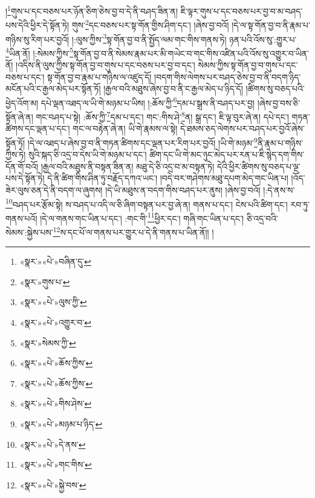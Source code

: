 །\footnote{«སྣར་»«པེ་»བཞིན་དུ་}གུས་པ་དང་བཅས་པར་ཉོན་ཅིག་ཅེས་བྱ་བ་དེ་ནི་བཤད་ཟིན་ན། ཇི་ལྟར་གུས་པ་དང་བཅས་པར་བྱ་བ་མ་བཤད་པས་དེའི་ཕྱིར་དེ་སྟོན་ཏེ། གུས་\footnote{«སྣར་»གུས་པ་}དང་བཅས་པར་སྟ་གོན་གྱིས་ཤིག་དང་། །ཞེས་བྱ་བའོ། །དེ་ལ་སྟ་གོན་བྱ་བ་ནི་རྣམ་པ་གཉིས་སུ་རིག་པར་བྱའོ། །:ལུས་ཀྱིས་\footnote{«སྣར་»«པེ་»ལུས་ཀྱི་}སྟ་གོན་བྱ་བ་ནི་སྤྱོད་ལམ་གང་གིས་གནས་ཏེ། ཉན་པའི་འོས་སུ་:གྱུར་པ་\footnote{«སྣར་»«པེ་»འགྱུར་བ་}ཡིན་ནོ། །:སེམས་ཀྱིས་\footnote{«སྣར་»སེམས་ཀྱི་}སྟ་གོན་བྱ་བ་ནི་སེམས་རྣམ་པར་མི་གཡེང་བ་གང་གིས་འཛིན་པའི་འོས་སུ་འགྱུར་བ་ཡིན་ནོ། །འདིས་ནི་ལུས་ཀྱིས་སྟ་གོན་བྱ་བ་གུས་པ་དང་བཅས་པར་བྱ་བ་དང་། སེམས་ཀྱིས་སྟ་གོན་བྱ་བ་གུས་པ་དང་བཅས་པ་དང་། སྟ་གོན་བྱ་བ་རྣམ་པ་གཉིས་ལ་འཛུད་དོ། །བདག་གིས་ལེགས་པར་བཤད་ཅེས་བྱ་བ་ནི་བདག་ཉིད་མངོན་པའི་ང་རྒྱལ་མེད་པར་སྟོན་ཏོ། །རྒྱལ་བའི་མཐུས་ཞེས་བྱ་བ་ནི་ང་རྒྱལ་མེད་པ་ཉིད་དོ། །ཚིགས་སུ་བཅད་པའི་ཕྱེད་འོག་མ། དཔེ་ལྡན་འཐད་ལ་ཡི་གེ་མཉམ་པ་ཡིས། །:ཆོས་ཀྱི་\footnote{«སྣར་»«པེ་»ཆོས་ཀྱིས་}དམ་པ་སྒྲས་ནི་བཤད་པར་བྱ། །ཞེས་བྱ་བས་ཅི་སྟོན་ཞེ་ན། གང་བཤད་པ་སྟེ། :ཆོས་ཀྱི་\footnote{«སྣར་»«པེ་»ཆོས་ཀྱིས་}དམ་པ་དང་། གང་:གིས་ཤེ་\footnote{«སྣར་»«པེ་»གིས་ཤེས་}ན། སྒྲ་དང་། ཇི་ལྟ་བུར་ཞེ་ན། དཔེ་དང་། གཏན་ཚིགས་དང་ལྡན་པ་དང་། གང་ལ་བརྟེན་ཞེ་ན། ཡི་གེ་རྣམས་ལ་སྟེ། དེ་ཐམས་ཅད་ལེགས་པར་བཤད་པར་བྱའོ་ཞེས་སྟོན་ཏོ། །དེ་ལ་འཐད་པ་ཞེས་བྱ་བ་ནི་གཏན་ཚིགས་དང་ལྡན་པར་རིག་པར་བྱའོ། །ཡི་གེ་མཉམ་\footnote{«སྣར་»«པེ་»མཉམ་པ་ཉིད་}ནི་རྣམ་པ་གཉིས་ཀྱིས་ཏེ། སུའི་སྐད་ཅི་འདྲ་བ་དེས་ཡི་གེ་མཉམ་པ་དང་། ཚིག་དང་ཡི་གེ་མང་ཉུང་མེད་པར་རན་པ་ཇི་སྙེད་དག་གིས་དོན་གོ་བའོ། །རྒྱལ་བའི་མཐུས་ནི་བསྟན་ཟིན་ན། མཐུ་དེ་ཅི་འདྲ་བ་མ་བསྟན་ཏེ། དེའི་ཕྱིར་ཚིགས་སུ་བཅད་པ་ལྔ་པས་དེ་སྟོན་ཏེ། དེ་ནི་ཚིག་གིས་ཤིན་ཏུ་བརྗོད་དཀའ་ཡང་། །བདེ་བར་གཤེགས་མཐུ་དཔག་མེད་གང་ཡིན་པ། །འོད་ཟེར་ལུས་ཅན་དེ་ནི་བདག་ལ་ཞུགས། །དེ་ཡི་མཐུས་ན་བདག་གིས་བཤད་པར་ནུས། །ཞེས་བྱ་བའོ། །:དེ་ནས་ས་\footnote{«སྣར་»«པེ་»དེ་ནས་}བཤད་པར་རྩོམ་སྟེ། ས་བཤད་པ་འདི་ལ་ཅི་ཞིག་བསྟན་པར་བྱ་ཞེ་ན། གནས་པ་དང་། ངེས་པའི་ཚིག་དང་། རབ་ཏུ་གནས་པའོ། །དེ་ལ་གནས་གང་ཡིན་པ་དང་། :གང་གི་\footnote{«སྣར་»«པེ་»གང་གིས་}ཕྱིར་དང་། གཞི་གང་ཡིན་པ་དང་། ཅི་འདྲ་བའི་སེམས་:སྐྱེས་པས་\footnote{«སྣར་»«པེ་»སྐྱེ་བས་}ས་དང་པོ་ལ་གནས་པར་གྱུར་པ་དེ་ནི་གནས་པ་ཡིན་ནོ།། །
